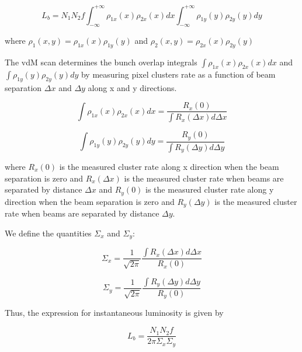 \begin{equation}
L_{b} = N_1 N_2 f \int^{+\infty}_{-\infty} \rho_{1x}(x) \rho_{2x}(x)  dx   \int^{+\infty}_{-\infty} \rho_{1y}(y) \rho_{2y}(y)  dy 
\end{equation}

where $\rho_1(x,y) = \rho_{1x}(x) \rho_{1y} (y)$ and $\rho_2(x,y) = \rho_{2x}(x) \rho_{2y} (y)$ 

The vdM scan determines the bunch  overlap integrals $\int \rho_{1x} (x) \rho_{2x} (x) dx$ and  $\int \rho_{1y}(y) \rho_{2y} (y) dy$ by measuring pixel clusters rate as a function of beam separation $\Delta x$ and $\Delta y$ along x and y directions. 

\begin{equation}
\int \rho_{1x} (x) \rho_{2x} (x) dx = \frac{R_x(0)}{\int R_x(\Delta x)d \Delta x} 
\end{equation}

\begin{equation}
\int \rho_{1y} (y) \rho_{2y} (y) dy = \frac{R_y(0)}{\int R_y(\Delta y)d \Delta y} 
\end{equation}

where $R_x(0)$ is the measured cluster rate along x direction when the beam separation is zero and $R_x(\Delta x)$ is the measured cluster rate when beams are separated by distance $\Delta x$ and $R_y(0)$ is the measured cluster rate along y direction when the beam separation is zero and $R_y(\Delta y)$ is the measured cluster rate when beams are separated by distance $\Delta y$. 

We define the quantities $\Sigma_x$ and $\Sigma_y$:


\begin{equation}
\Sigma_x = \frac{1}{\sqrt{2 \pi}} \frac{\int R_x(\Delta x)d \Delta x}{R_x(0)} 
\end{equation}

\begin{equation}
\Sigma_y =  \frac{1}{\sqrt{2 \pi}} \frac{\int R_y(\Delta y)d \Delta y}{R_y(0)} 
\end{equation}

Thus, the expression for instantaneous luminosity is given by 

\begin{equation}
L_{b} = \frac{N_1 N_2 f}{2\pi \Sigma_x \Sigma_y}
\end{equation}

